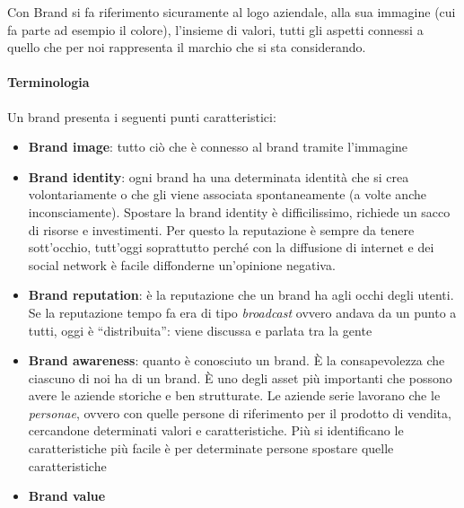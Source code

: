 Con Brand si fa riferimento sicuramente al logo aziendale, alla sua immagine
(cui fa parte ad esempio il colore), l'insieme di valori, tutti gli aspetti
connessi a quello che per noi rappresenta il marchio che si sta considerando.

\paragraph*{Terminologia} Un brand presenta i seguenti punti caratteristici:
\begin{itemize}
 \item \textbf{Brand image}: tutto ciò che è connesso al brand tramite
l'immagine
 \item \textbf{Brand identity}: ogni brand ha una determinata identità che si
crea volontariamente o che gli viene associata spontaneamente (a volte anche
inconsciamente).
Spostare la brand identity è difficilissimo, richiede un sacco di risorse e
investimenti.
Per questo la reputazione è sempre da tenere sott'occhio, tutt'oggi soprattutto
perché con la diffusione di internet e dei social network è facile diffonderne
un'opinione negativa.
 \item \textbf{Brand reputation}: è la reputazione che un brand ha agli occhi
degli utenti.
Se la reputazione tempo fa era di tipo \textit{broadcast} ovvero andava da un
punto a tutti, oggi è ``distribuita'': viene discussa e parlata tra la gente
 \item \textbf{Brand awareness}: quanto è conosciuto un brand.
È la consapevolezza che ciascuno di noi ha di un brand.
È uno degli asset più importanti che possono avere le aziende storiche e ben
strutturate.
Le aziende serie lavorano che le \textit{personae}, ovvero con quelle persone
di riferimento per il prodotto di vendita, cercandone determinati valori e
caratteristiche.
Più si identificano le caratteristiche più facile è per determinate persone
spostare quelle caratteristiche
 \item \textbf{Brand value}
\end{itemize}
